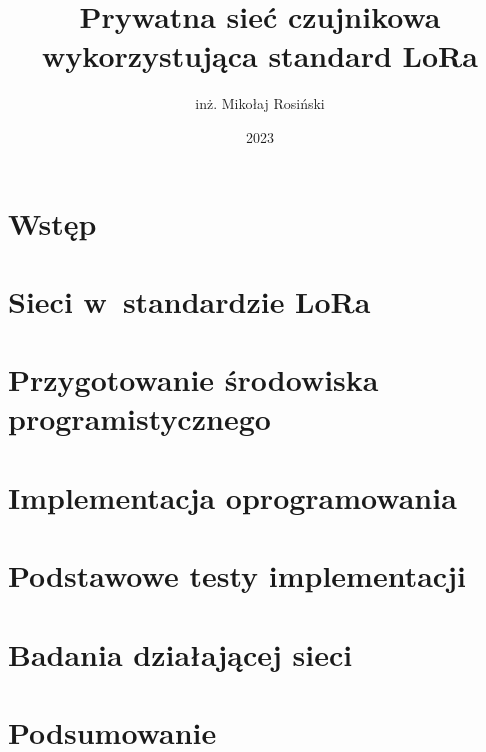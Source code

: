 \documentclass[thesis=mgr,faculty=ee]{EE-dyplom}
\title{Prywatna sieć czujnikowa wykorzystująca standard LoRa}
\author{inż. Mikołaj Rosiński}
\date{2023}
\begin{document}
\frontpages

\chapter{Wstęp}


\chapter{Sieci w~standardzie LoRa}


\chapter{Przygotowanie środowiska programistycznego\label{ch:development}}


\chapter{Implementacja oprogramowania\label{ch:implementation}}


\chapter{Podstawowe testy implementacji\label{ch:testing}}


\chapter{Badania działającej sieci\label{ch:research}}


\chapter{Podsumowanie\label{ch:summary}}


\bibliografia

\listoffigures
\end{document}
